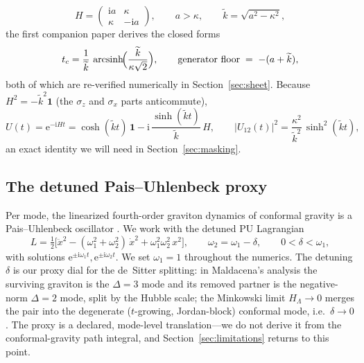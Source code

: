 \documentclass[11pt]{article}
\theoremstyle{definition}
\theoremstyle{remark}
\newcommand{\ii}{\mathrm{i}}
\newcommand{\ee}{\mathrm{e}}
\newcommand{\wt}{\widetilde{k}}
\begin{document}
\begin{equation}
H=\begin{pmatrix}\ii a&\kappa\\ \kappa&-\ii a\end{pmatrix},
\qquad a>\kappa,\qquad \wt=\sqrt{a^{2}-\kappa^{2}},
\label{eq:dimer}
\end{equation}
the first companion paper derives the closed forms
\begin{equation}
t_{c}=\frac{1}{\wt}\,
\operatorname{arcsinh}\!\Bigl(\frac{\wt}{\kappa\sqrt{2}}\Bigr),
\qquad
\text{generator floor}\;=\;-(a+\wt),
\label{eq:tcfloor}
\end{equation}
both of which are re-verified numerically in
Section~\ref{sec:sheet}. Because $H^{2}=-\wt^{2}\mathbf{1}$
(the $\sigma_{z}$ and $\sigma_{x}$ parts anticommute),
\begin{equation}
U(t)=\ee^{-\ii Ht}
=\cosh(\wt t)\,\mathbf{1}-\ii\,\frac{\sinh(\wt t)}{\wt}\,H,
\qquad
|U_{12}(t)|^{2}
=\frac{\kappa^{2}}{\wt^{2}}\,\sinh^{2}(\wt t),
\label{eq:dimerU}
\end{equation}
an exact identity we will need in Section~\ref{sec:masking}.

\subsection{The detuned Pais--Uhlenbeck proxy}
\label{sec:pu}

Per mode, the linearized fourth-order graviton dynamics of conformal
gravity is a Pais--Uhlenbeck oscillator \cite{PaisUhlenbeck1950}. We
work with the detuned PU Lagrangian
\begin{equation}
L=\tfrac12\bigl[\ddot x^{2}
-(\omega_{1}^{2}+\omega_{2}^{2})\,\dot x^{2}
+\omega_{1}^{2}\omega_{2}^{2}\,x^{2}\bigr],
\qquad
\omega_{2}=\omega_{1}-\delta,\qquad 0<\delta<\omega_{1},
\label{eq:PUlag}
\end{equation}
with solutions $\ee^{\pm\ii\omega_{1}t},\ee^{\pm\ii\omega_{2}t}$. We
set $\omega_{1}=1$ throughout the numerics. The detuning $\delta$ is
our proxy dial for the de~Sitter splitting: in
Maldacena's analysis \cite{Maldacena2011} the surviving graviton is
the $\Delta=3$ mode and its removed partner is the negative-norm
$\Delta=2$ mode, split by the Hubble scale; the Minkowski limit
$H_{\Lambda}\to0$ merges the pair into the degenerate ($t$-growing,
Jordan-block) conformal mode, i.e.\ $\delta\to0$. The proxy is a
declared, mode-level translation---we do not derive it from the
conformal-gravity path integral, and Section~\ref{sec:limitations}
returns to this point.
\end{document}
